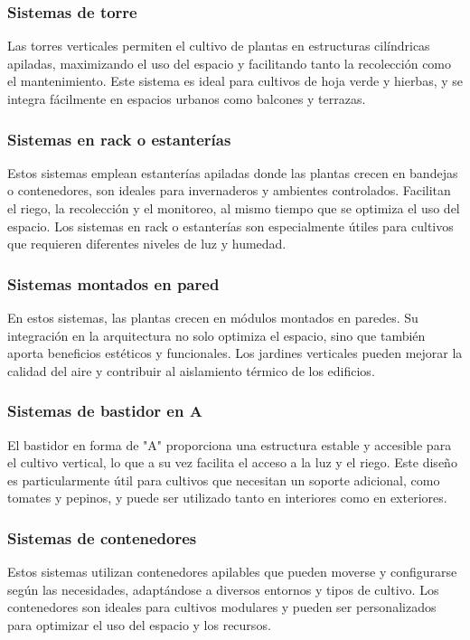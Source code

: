 \subsubsection{Sistemas de torre}
Las torres verticales permiten el cultivo de plantas en estructuras cilíndricas apiladas, maximizando el uso del espacio y facilitando tanto la recolección como el mantenimiento.
Este sistema es ideal para cultivos de hoja verde y hierbas, y se integra fácilmente en espacios urbanos como balcones y terrazas.

\subsubsection{Sistemas en rack o estanterías}
Estos sistemas emplean estanterías apiladas donde las plantas crecen en bandejas o contenedores, son ideales para invernaderos y ambientes controlados. Facilitan el riego, la recolección y el monitoreo, al mismo tiempo que se optimiza el uso del espacio.
Los sistemas en rack o estanterías son especialmente útiles para cultivos que requieren diferentes niveles de luz y humedad.

\subsubsection{Sistemas montados en pared}
En estos sistemas, las plantas crecen en módulos montados en paredes. Su integración en la arquitectura no solo optimiza el espacio, sino que también aporta beneficios estéticos y funcionales.
Los jardines verticales pueden mejorar la calidad del aire y contribuir al aislamiento térmico de los edificios.

\subsubsection{Sistemas de bastidor en A}
El bastidor en forma de "A" proporciona una estructura estable y accesible para el cultivo vertical, lo que a su vez facilita el acceso a la luz y el riego.
Este diseño es particularmente útil para cultivos que necesitan un soporte adicional, como tomates y pepinos, y puede ser utilizado tanto en interiores como en exteriores.

\subsubsection{Sistemas de contenedores}
Estos sistemas utilizan contenedores apilables que pueden moverse y configurarse según las necesidades, adaptándose a diversos entornos y tipos de cultivo.
Los contenedores son ideales para cultivos modulares y pueden ser personalizados para optimizar el uso del espacio y los recursos.



